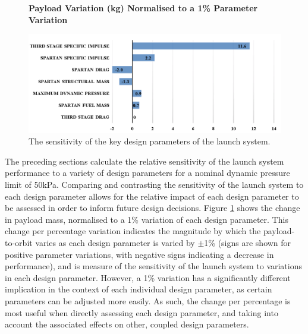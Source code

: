 \begin{figure}[ht!]
	\centering
	\textbf{Payload Variation (kg) Normalised to a 1\% Parameter Variation}\par\medskip
	\includegraphics[width=0.99\linewidth]{figures/5_Ascent/BarChartRelativePayloadChange}
	\caption{The sensitivity of the key design parameters of the launch system.}
	\label{fig:BarChartRelativePayloadChange}
\end{figure}
\noindent
The preceding sections calculate the relative sensitivity of the launch system performance to a variety of design parameters for a nominal dynamic pressure limit of 50kPa. 
Comparing and contrasting the sensitivity of the launch system to each design parameter allows for the relative impact of each design parameter to be assessed in order to inform future design decisions. 
Figure \ref{fig:BarChartRelativePayloadChange} shows the change in payload mass, normalised to a 1\% variation of each design parameter. 
This change per percentage variation indicates the magnitude by which the payload-to-orbit varies as each design parameter is varied by $\pm$1\% (signs are shown for positive parameter variations, with negative signs indicating a decrease in performance), and is measure of the sensitivity of the launch system to variations in each design parameter. 
However, a 1\% variation has a significantly different implication in the context of each individual design parameter, as certain parameters can be adjusted more easily. 
As such, the change per percentage is most useful when directly assessing each design parameter, and taking into account the associated effects on other, coupled design parameters. 

